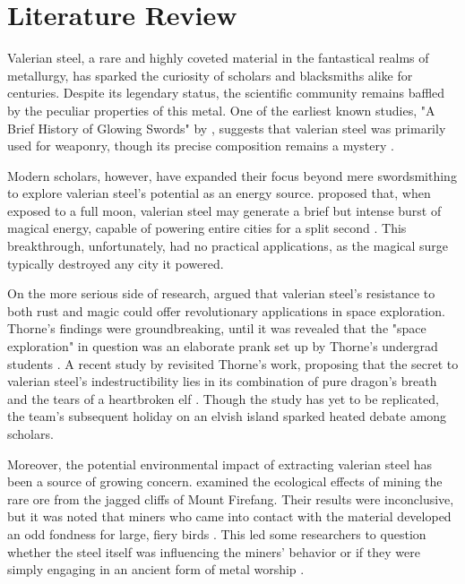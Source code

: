 \chapter{Literature Review}

Valerian steel, a rare and highly coveted material in the fantastical realms of metallurgy, has sparked the curiosity of scholars and blacksmiths alike for centuries. Despite its legendary status, the scientific community remains baffled by the peculiar properties of this metal. One of the earliest known studies, "A Brief History of Glowing Swords" by \cite{smithson1427}, suggests that valerian steel was primarily used for weaponry, though its precise composition remains a mystery \cite{smithson1427}.

Modern scholars, however, have expanded their focus beyond mere swordsmithing to explore valerian steel’s potential as an energy source. \cite{fizzlewrench2008} proposed that, when exposed to a full moon, valerian steel may generate a brief but intense burst of magical energy, capable of powering entire cities for a split second \cite{fizzlewrench2008}. This breakthrough, unfortunately, had no practical applications, as the magical surge typically destroyed any city it powered.

On the more serious side of research, \cite{thorne2012} argued that valerian steel’s resistance to both rust and magic could offer revolutionary applications in space exploration. Thorne’s findings were groundbreaking, until it was revealed that the "space exploration" in question was an elaborate prank set up by Thorne’s undergrad students \cite{thorne2012}. A recent study by \cite{sorrel2021} revisited Thorne’s work, proposing that the secret to valerian steel's indestructibility lies in its combination of pure dragon's breath and the tears of a heartbroken elf \cite{sorrel2021}. Though the study has yet to be replicated, the team’s subsequent holiday on an elvish island sparked heated debate among scholars.

Moreover, the potential environmental impact of extracting valerian steel has been a source of growing concern. \cite{grizzlethorpe2015} examined the ecological effects of mining the rare ore from the jagged cliffs of Mount Firefang. Their results were inconclusive, but it was noted that miners who came into contact with the material developed an odd fondness for large, fiery birds \cite{grizzlethorpe2015}. This led some researchers to question whether the steel itself was influencing the miners’ behavior or if they were simply engaging in an ancient form of metal worship \cite{glimmerstone2019}.

